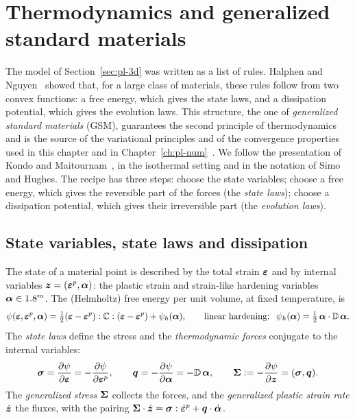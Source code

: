 \section{Thermodynamics and generalized standard materials}\label{sec:pl-gsm}
%
The model of Section~\ref{sec:pl-3d} was written as a list of rules. Halphen
and Nguyen~\cite{HalphenNguyen1975} showed that, for a large class of
materials, these rules follow from two convex functions: a free energy, which
gives the state laws, and a dissipation potential, which gives the evolution
laws. This structure, the one of \emph{generalized standard materials}
(GSM), guarantees the second principle of thermodynamics and is the source of
the variational principles and of the convergence properties used in this
chapter and in Chapter~\ref{ch:pl-num}~\cite{GermainNguyenSuquet1983,LemaitreChaboche1990,Nguyen2000}.
We follow the presentation of Kondo and Maitournam~\cite{KondoMaitournam2023},
in the isothermal setting and in the notation of Simo and Hughes. The recipe
has three steps: choose the state variables; choose a free energy, which gives
the reversible part of the forces (the \emph{state laws}); choose a
dissipation potential, which gives their irreversible part (the
\emph{evolution laws}).

\subsection{State variables, state laws and dissipation}\label{ssec:pl-state}
%
The state of a material point is described by the total strain $\bm{\varepsilon}$ and by
internal variables $\bm{z}=(\bm{\varepsilon}^{p},\bm{\alpha})$: the plastic strain and strain-like
hardening variables $\bm{\alpha}\in1.8^m$. The (Helmholtz) free energy per unit
volume, at fixed temperature, is
\begin{equation}\label{eq:pl-psi}
  \psi(\eps,\epsp,\valpha)=\tfrac12(\eps-\epsp):\bbC:(\eps-\epsp)+\psi_h(\valpha),
  \qquad\text{linear hardening: }\ \psi_h(\valpha)=\tfrac12\,\valpha\cdot\bbD\,\valpha .
\end{equation}
The \emph{state laws} define the stress and the \emph{thermodynamic forces}
conjugate to the internal variables:
\begin{equation}\label{eq:pl-statelaws}
  \bm{\sigma}=\frac{\partial\psi}{\partial\bm{\varepsilon}}=-\frac{\partial\psi}{\partial\bm{\varepsilon}^{p}},
  \qquad
  \bm{q}=-\frac{\partial\psi}{\partial\bm{\alpha}}=-\mathbb{D}\,\bm{\alpha},
  \qquad
  \bm{\Sigma}:=-\frac{\partial\psi}{\partial\bm{z}}=(\bm{\sigma},\bm{q}).
\end{equation}
The \emph{generalized stress} $\bm{\Sigma}$ collects the forces, and the
\emph{generalized plastic strain rate} $\dot{\bm{z}}$ the fluxes, with the pairing
$\bm{\Sigma}\cdot\dot{\bm{z}}=\bm{\sigma}:\dot{\bm{\varepsilon}}^p+\bm{q}\cdot\dot{\bm{\alpha}}$.


